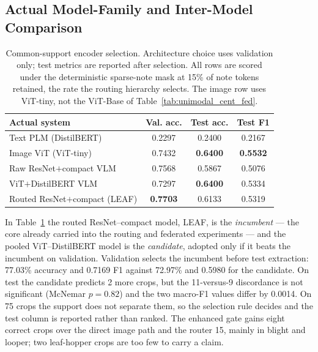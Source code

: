 \documentclass[conference]{IEEEtran}
\begin{document}
\subsection{Actual Model-Family and Inter-Model Comparison}







\begin{table}[t]
\caption{Common-support encoder selection. Architecture choice uses validation only; test metrics are reported after selection. All rows are scored under the deterministic sparse-note mask at 15\% of note tokens retained, the rate the routing hierarchy selects. The image row uses ViT-tiny, not the ViT-Base of Table~\ref{tab:unimodal_cent_fed}.}
\label{tab:family_comparison}
\centering\footnotesize
\setlength\tabcolsep{4pt}
\begin{tabular}{lccc}
\toprule
\textbf{Actual system} & \textbf{Val. acc.} & \textbf{Test acc.} & \textbf{Test F1}\\
\midrule
Text PLM (DistilBERT) & 0.2297 & 0.2400 & 0.2167\\
Image ViT (ViT-tiny) & 0.7432 & \textbf{0.6400} & \textbf{0.5532}\\
Raw ResNet$+$compact VLM & 0.7568 & 0.5867 & 0.5076\\
ViT$+$DistilBERT VLM & 0.7297 & \textbf{0.6400} & 0.5334\\
Routed ResNet$+$compact (LEAF) & \textbf{0.7703} & 0.6133 & 0.5319\\
\bottomrule
\end{tabular}
\end{table}



In Table~\ref{tab:family_comparison} the routed ResNet--compact model, LEAF, is the
\emph{incumbent} --- the core already carried into the routing and federated
experiments --- and the pooled ViT--DistilBERT model is the \emph{candidate},
adopted only if it beats the incumbent on validation. Validation selects the
incumbent before test extraction: 77.03\% accuracy and 0.7169 F1
against 72.97\% and 0.5980 for the candidate. On test the candidate
predicts 2 more crops, but the 11-versus-9 discordance is not
significant (McNemar $p=0.82$) and the two macro-F1 values differ by
0.0014. On 75 crops the support does not separate them, so the
selection rule decides and the test column is reported rather than ranked. The
enhanced gate gains eight correct crops over the direct image path and the
router 15, mainly in blight and looper; two leaf-hopper crops are too few to
carry a claim.
\end{document}
